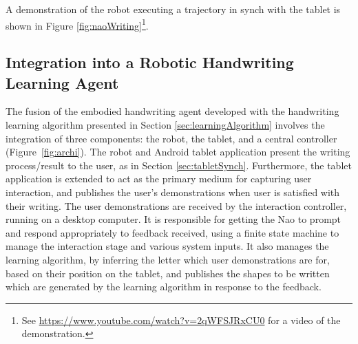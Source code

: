 \documentclass{sig-alternate}
\begin{document}
A demonstration of the robot executing a trajectory in synch with the tablet is
shown in Figure \ref{fig:naoWriting}\footnote{See
\url{https://www.youtube.com/watch?v=2qWFSJRxCU0} for a video of the
demonstration. }. %
%
%


\subsection{Integration into a Robotic Handwriting Learning Agent}

The fusion of the embodied handwriting agent developed with the handwriting
learning algorithm presented in Section \ref{sec:learningAlgorithm} involves the
integration of three components: the robot, the tablet, and a central controller
(Figure~\ref{fig:archi}).  The robot and Android tablet application present the
writing process/result to the user, as in Section \ref{sec:tabletSynch}.
Furthermore, the tablet application is extended to act as the primary medium for
capturing user interaction, and publishes the user's demonstrations when user is
satisfied with their writing. The user demonstrations are received by the
interaction controller, running on a desktop computer. It is responsible for
getting the Nao to prompt and respond appropriately to feedback received, using
a finite state machine to manage the interaction stage and various system
inputs. It also manages the learning algorithm, by inferring the letter which
user demonstrations are for, based on their position on the tablet, and
publishes the shapes to be written which are generated by the learning algorithm
in response to the feedback.  


\end{document}
